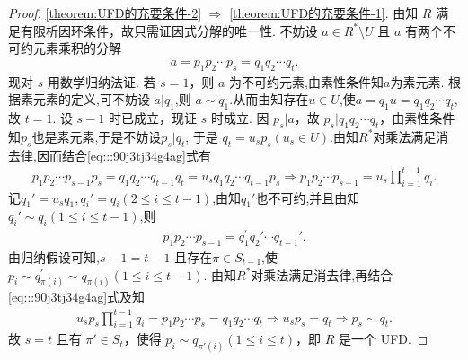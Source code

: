 \documentclass[../../main.tex]{subfiles}%
\begin{document}
\begin{proof}
\ref{theorem:UFD的充要条件-2} \( \Rightarrow \) \ref{theorem:UFD的充要条件-1}. 由知 \( R \) 满足有限析因环条件，故只需证因式分解的唯一性. 不妨设 \( a \in R^* \setminus U \) 且 \( a \) 有两个不可约元素乘积的分解
\begin{align}\label{eq:::90j3tj34g4ag}
a = p_1p_2\cdots p_s = q_1q_2\cdots q_t.
\end{align}
现对 \( s \) 用数学归纳法证. 若 \( s = 1 \)，则 \( a \) 为不可约元素,由素性条件知$a$为素元素. 根据素元素的定义,可不妨设 \( a|q_1 \),则 \( a \sim q_1 \).从而由知存在$u\in U$,使$a=q_1u=q_1q_2\cdots q_t$,故 \( t = 1 \). 设 \( s - 1 \) 时已成立，现证 \( s \) 时成立. 因 \( p_s|a \)，故 \( p_s|q_1q_2\cdots q_t \)，由素性条件知$p_s$也是素元素,于是不妨设\( p_s|q_{t} \), 于是 \( q_{t} = u_sp_s(u_s \in U) \).由知$R^*$对乘法满足消去律,因而结合\eqref{eq:::90j3tj34g4ag}式有
\begin{align*}
p_1p_2\cdots p_{s-1}p_s=q_1q_2\cdots q_{t-1}q_t=u_sq_1q_2\cdots q_{t-1}p_s\Longrightarrow p_1p_2\cdots p_{s-1}=u_s\prod_{i=1}^{t-1}{q_i}.
\end{align*}
记$q_1'=u_sq_1,q_i'=q_i(2\leqslant i\leqslant t-1)$,由知$q_1'$也不可约,并且由知$q_i'\sim q_i(1\leqslant i\leqslant t-1)$,则
\begin{align*}
p_1p_2\cdots p_{s-1}=q_{1}^{\prime}q_2'\cdots q_{t-1}'.
\end{align*}
由归纳假设可知,\( s - 1 = t - 1 \) 且存在$\pi \in S_{t-1}$,使  \(p_i\sim q_{\pi \left( i \right)}^{\prime}\sim q_{\pi (i)}(1\leqslant i\leqslant t-1)\).
由知$R^*$对乘法满足消去律,再结合\eqref{eq:::90j3tj34g4ag}式及知
\begin{align*}
u_sp_s\prod_{i=1}^{t-1}{q_i}=p_1p_2\cdots p_s=q_1q_2\cdots q_t\Longrightarrow u_sp_s=q_t\Longrightarrow p_s\sim q_t.
\end{align*}
故 \( s = t \) 且有 \( \pi' \in S_t \)，使得 \( p_i \sim q_{\pi'
(i)}(1 \leqslant i \leqslant t) \)，即 \( R \) 是一个 UFD.
\end{proof}
\end{document}
